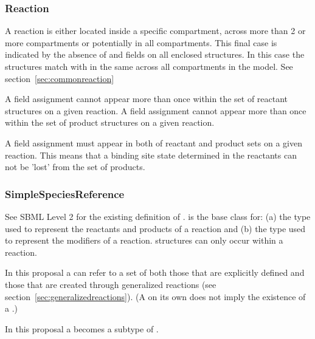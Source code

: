 \documentclass{cekarticle}
\begin{document}
\subsubsection{Reaction}

A reaction
is either located inside a specific compartment, across more than 2 or more compartments or
 potentially in all compartments.  This final case is indicated by the absence of 
 and  fields on all enclosed 
structures. In this case the  structures match with 
in the same  across all compartments in the model.
See section~\ref{sec:commonreaction}

A   field assignment cannot appear more than once within the set of
reactant  structures on a given reaction.
A   field assignment cannot appear more than once within the set of
product  structures on a given reaction.

A   field assignment must appear in both
of reactant and product  sets on a given reaction.  This means that a 
binding site state determined in the reactants can not be 'lost' from the set of products.

\subsubsection{SimpleSpeciesReference}

See SBML Level 2 for the existing definition of .
 is the base class for: (a)  the type used
to represent the reactants and products of a reaction and (b)  the
type used to represent the modifiers of a reaction.   structures
can only occur within a reaction.

In this proposal a  can refer to a set of  both
those that are explicitly defined and those that are created through generalized reactions
(see section~\ref{sec:generalizedreactions}).  (A  on its own does not
imply the existence of a .)

In this proposal a  becomes a subtype of .
\end{document}
